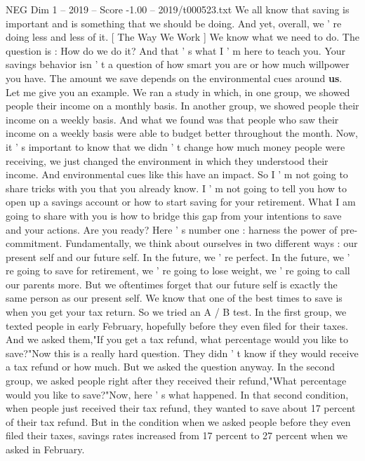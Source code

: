 \begin{textsample}{NEG Dim 1 – 2019 – Score -1.00 – 2019/t000523.txt}  \label{ex:f1_neg_022}
We all know that saving is important and is something that we should be doing.
And yet, overall, we ' re doing less and less of it. [ The Way We Work ] We know what we need to do.
The question is : How do we do it?
And that ' s what I ' m here to teach you.
Your savings behavior isn ' t a question of how smart you are or how much willpower you have.
The amount we save depends on the environmental cues around \textbf{us}.
Let me give you an example.
We ran a study in which, in one group, we showed people their income on a monthly basis.
In another group, we showed people their income on a weekly basis.
And what we found was that people who saw their income on a weekly basis were able to budget better throughout the month.
Now, it ' s important to know that we didn ' t change how much money people were receiving, we just changed the environment in which they understood their income.
And environmental cues like this have an impact.
So I ' m not going to share tricks with you that you already know.
I ' m not going to tell you how to open up a savings account or how to start saving for your retirement.
What I am going to share with you is how to bridge this gap from your intentions to save and your actions.
Are you ready?
Here ' s number one : harness the power of pre-commitment.
Fundamentally, we think about ourselves in two different ways : our present self and our future self.
In the future, we ' re perfect.
In the future, we ' re going to save for retirement, we ' re going to lose weight, we ' re going to call our parents more.
But we oftentimes forget that our future self is exactly the same person as our present self.
We know that one of the best times to save is when you get your tax return.
So we tried an A / B test.
In the first group, we texted people in early February, hopefully before they even filed for their taxes.
And we asked them,"If you get a tax refund, what percentage would you like to save?"Now this is a really hard question.
They didn ' t know if they would receive a tax refund or how much.
But we asked the question anyway.
In the second group, we asked people right after they received their refund,"What percentage would you like to save?"Now, here ' s what happened.
In that second condition, when people just received their tax refund, they wanted to save about 17 percent of their tax refund.
But in the condition when we asked people before they even filed their taxes, savings rates increased from 17 percent to 27 percent when we asked in February.

\end{textsample}
